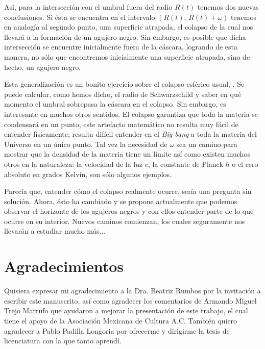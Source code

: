 \documentclass[12pt]{article}
\begin{document}
Así, para la intersección con el umbral fuera del radio $R(t)$ tenemos dos nuevas conclusiones. Si ésta se encuentra en el intervalo $\left(R(t),\,R(t) + \omega\right)$ tenemos en analogía al segundo punto, una superficie atrapada, el colapso de la cual nos llevará a la formación de un agujero negro. Sin embargo, es posible que dicha intersección se encuentre inicialmente fuera de la cáscara, logrando de esta manera, no sólo que encontremos inicialmente una superficie atrapada, sino de hecho, un agujero negro.

Esta generalización es un bonito ejercicio sobre el colapso esférico usual, \cite{Wa}. Se puede calcular, como hemos dicho, el radio de Schwarzschild y saber en qué momento el umbral sobrepasa la cáscara en el colapso. Sin embargo, es interesante en muchos otros sentidos. El colapso garantiza que toda la materia se condensará en un punto, este artefacto matemático no resulta muy fácil de entender físicamente; resulta difícil entender en el \emph{Big bang} a toda la materia del Universo en un único punto. Tal vez la necesidad de $\omega$ sea un camino para mostrar que la densidad de la materia tiene un límite así como existen muchos otros en la naturaleza: la velocidad de la luz $c$, la constante de Planck $\hbar$ o el cero absoluto en grados Kelvin, son sólo algunos ejemplos.

Parecía que, entender cómo el colapso realmente ocurre, sería una pregunta sin solución. Ahora, ésto ha cambiado y se propone actualmente que podemos observar el horizonte de los agujeros negros y con ellos entender parte de lo que ocurre en su interior. Nuevos caminos comienzan, los cuales seguramente nos llevarán a estudiar mucho más...




\section*{Agradecimientos}
\noindent
Quisiera expresar mi agradecimiento a la Dra. Beatriz Rumbos por la invitación a escribir este manuscrito, así como agradecer los comentarios de Armando Miguel Trejo Marrufo que ayudaron a mejorar la presentación de este trabajo, el cual tiene el apoyo de la Asociación Mexicana de Cultura A.C. También quiero agradecer a Pablo Padilla Longoria por ofrecerme y dirigirme la tesis de licenciatura con la que tanto aprendí.



{}

\end{document}
